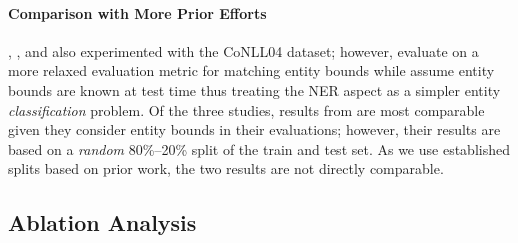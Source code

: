 \documentclass{clv3}
\begin{document}
\paragraph{Comparison with More Prior Efforts} , , and  also experimented with the CoNLL04 dataset; however,  evaluate on a more relaxed evaluation metric for matching entity bounds while  assume entity bounds are known at test time thus treating the NER aspect  as a simpler entity \emph{classification} problem. Of the three studies, results from  are most comparable given they consider entity bounds in their evaluations; however, their results are based on a \emph{random} 80\%--20\% split of the train and test set. As we use established splits based on prior work, the two results are not directly comparable.

\subsection{Ablation Analysis}

\begin{table}[ht]
  \caption{Ablation studies for relation extraction over the CoNLL04 and ADE dataset; each row after the first indicates removal of a particular feature/component.}
  \label{tab_ablation}
  \centering
  \renewcommand{\arraystretch}{1.2}
\end{table}
\end{document}

